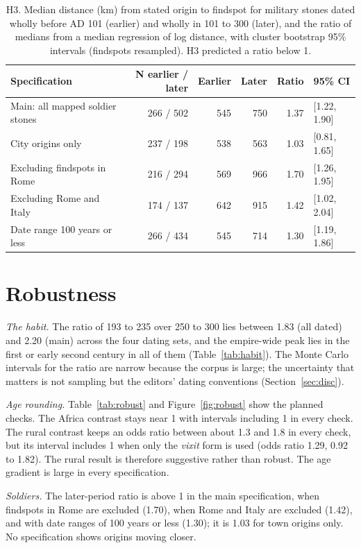 \documentclass[11pt,a4paper]{article}
\begin{document}
\begin{table}[tbp]\centering\small\caption{H3. Median distance (km) from stated origin to findspot for military stones dated wholly before AD 101 (earlier) and wholly in 101 to 300 (later), and the ratio of medians from a median regression of log distance, with cluster bootstrap 95\% intervals (findspots resampled). H3 predicted a ratio below 1.}\label{tab:h3}\begin{tabular}{lrrrrl}\toprule Specification & N earlier / later & Earlier & Later & Ratio & 95\% CI\\\midrule
Main: all mapped soldier stones & 266 / 502 & 545 & 750 & 1.37 & [1.22, 1.90]\\
City origins only & 237 / 198 & 538 & 563 & 1.03 & [0.81, 1.65]\\
Excluding findspots in Rome & 216 / 294 & 569 & 966 & 1.70 & [1.26, 1.95]\\
Excluding Rome and Italy & 174 / 137 & 642 & 915 & 1.42 & [1.02, 2.04]\\
Date range 100 years or less & 266 / 434 & 545 & 714 & 1.30 & [1.19, 1.86]\\
\bottomrule\end{tabular}\end{table}

\section{Robustness}\label{sec:robust}
\textit{The habit.} The ratio of 193 to 235 over 250 to 300 lies between 1.83 (all dated) and 2.20 (main) across the four dating sets, and the empire-wide peak lies in the first or early second century in all of them (Table~\ref{tab:habit}). The Monte Carlo intervals for the ratio are narrow because the corpus is large; the uncertainty that matters is not sampling but the editors' dating conventions (Section~\ref{sec:disc}).

\textit{Age rounding.} Table~\ref{tab:robust} and Figure~\ref{fig:robust} show the planned checks. The Africa contrast stays near 1 with intervals including 1 in every check. The rural contrast keeps an odds ratio between about 1.3 and 1.8 in every check, but its interval includes 1 when only the \textit{vixit} form is used (odds ratio 1.29, 0.92 to 1.82). The rural result is therefore suggestive rather than robust. The age gradient is large in every specification.

\textit{Soldiers.} The later-period ratio is above 1 in the main specification, when findspots in Rome are excluded (1.70), when Rome and Italy are excluded (1.42), and with date ranges of 100 years or less (1.30); it is 1.03 for town origins only. No specification shows origins moving closer.
\end{document}
